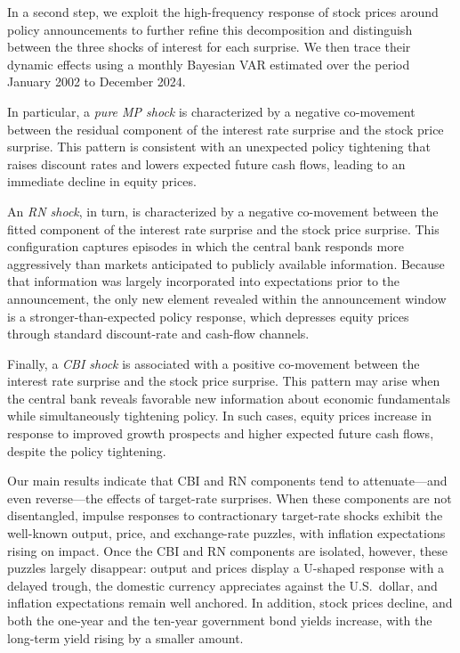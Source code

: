 \documentclass[12pt, reqno]{article}
\begin{document}
In a second step, we exploit the high-frequency response of stock prices around policy announcements to further refine this decomposition and distinguish between the three shocks of interest for each surprise. We then trace their dynamic effects using a monthly Bayesian VAR estimated over the period January 2002 to December 2024.

In particular, a \emph{pure MP shock} is characterized by a negative co-movement between the residual component of the interest rate surprise and the stock price surprise. This pattern is consistent with an unexpected policy tightening that raises discount rates and lowers expected future cash flows, leading to an immediate decline in equity prices.

An \emph{RN shock}, in turn, is characterized by a negative co-movement between the fitted component of the interest rate surprise and the stock price surprise. This configuration captures episodes in which the central bank responds more aggressively than markets anticipated to publicly available information. Because that information was largely incorporated into expectations prior to the announcement, the only new element revealed within the announcement window is a stronger-than-expected policy response, which depresses equity prices through standard discount-rate and cash-flow channels.

Finally, a \emph{CBI shock} is associated with a positive co-movement between the interest rate surprise and the stock price surprise. This pattern may arise when the central bank reveals favorable new information about economic fundamentals while simultaneously tightening policy. In such cases, equity prices increase in response to improved growth prospects and higher expected future cash flows, despite the policy tightening.

Our main results indicate that CBI and RN components tend to attenuate—and even reverse—the effects of target-rate surprises. When these components are not disentangled, impulse responses to contractionary target-rate shocks exhibit the well-known output, price, and exchange-rate puzzles, with inflation expectations rising on impact. Once the CBI and RN components are isolated, however, these puzzles largely disappear: output and prices display a U-shaped response with a delayed trough, the domestic currency appreciates against the U.S.\ dollar, and inflation expectations remain well anchored. In addition, stock prices decline, and both the one-year and the ten-year government bond yields increase, with the long-term yield rising by a smaller amount.
\end{document}
